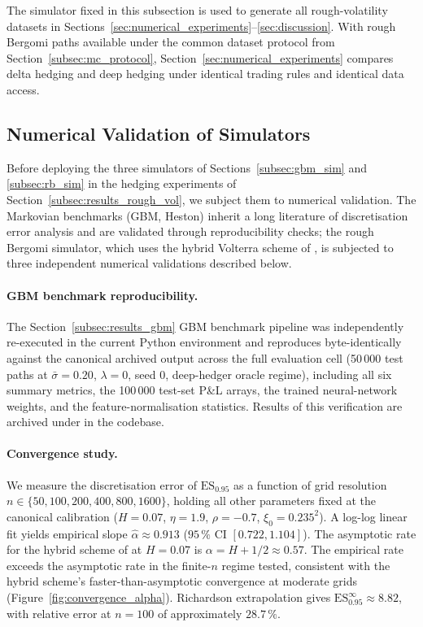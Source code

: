 \documentclass[12pt,a4paper]{article}
\theoremstyle{definition}
\theoremstyle{plain}
\theoremstyle{remark}
\theoremstyle{plain}
\begin{document}
The simulator fixed in this subsection is used to generate all rough-volatility datasets in Sections~\ref{sec:numerical_experiments}--\ref{sec:discussion}.
With rough Bergomi paths available under the common dataset protocol from Section~\ref{subsec:mc_protocol}, Section~\ref{sec:numerical_experiments} compares delta hedging and deep hedging under identical trading rules and identical data access.

\subsection{Numerical Validation of Simulators}
\label{subsec:sim_validation}

Before deploying the three simulators of Sections~\ref{subsec:gbm_sim} and
\ref{subsec:rb_sim} in the hedging experiments of
Section~\ref{subsec:results_rough_vol}, we subject them to numerical
validation. The Markovian benchmarks (GBM, Heston) inherit a long literature
of discretisation error analysis and are validated through reproducibility
checks; the rough Bergomi simulator, which uses the hybrid Volterra scheme of
\cite{BennedsenLundePakkanen2017}, is subjected to three independent
numerical validations described below.

\paragraph{GBM benchmark reproducibility.}
The Section~\ref{subsec:results_gbm} GBM benchmark pipeline was independently
re-executed in the current Python environment and reproduces byte-identically
against the canonical archived output across the full evaluation cell
(50\,000 test paths at $\bar{\sigma} = 0.20$, $\lambda = 0$, seed $0$,
deep-hedger oracle regime), including all six summary metrics, the
100\,000 test-set P\&L arrays, the trained neural-network weights, and the
feature-normalisation statistics. Results of this verification are archived
under  in the codebase.

\paragraph{Convergence study.}
We measure the discretisation error of $\mathrm{ES}_{0.95}$ as a function of
grid resolution $n \in \{50, 100, 200, 400, 800, 1600\}$, holding all other
parameters fixed at the canonical calibration ($H = 0.07$, $\eta = 1.9$,
$\rho = -0.7$, $\xi_0 = 0.235^2$). A log-log linear fit yields empirical
slope $\hat{\alpha} \approx 0.913$ ($95\,\%$ CI $[0.722, 1.104]$). The
asymptotic rate for the hybrid scheme of \cite{BennedsenLundePakkanen2017}
at $H = 0.07$ is $\alpha = H + 1/2 \approx 0.57$. The empirical rate exceeds
the asymptotic rate in the finite-$n$ regime tested, consistent with the
hybrid scheme's faster-than-asymptotic convergence at moderate grids
(Figure~\ref{fig:convergence_alpha}). Richardson extrapolation gives
$\mathrm{ES}_{0.95}^{\infty} \approx 8.82$, with relative error at $n = 100$
of approximately $28.7\,\%$.
\end{document}
